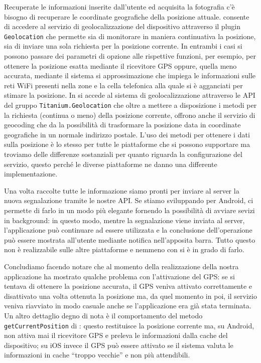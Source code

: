 			Recuperate le informazioni inserite dall'utente ed acquisita la
			fotografia c'è bisogno di recuperare le coordinate geografiche della
			posizione attuale. \pg{} consente di accedere al servizio di
			geolocalizzazione del dispositivo attraverso il plugin
			\texttt{Geolocation} che permette sia di monitorare in maniera
			continuativa la posizione, sia di inviare una sola richiesta per la
			posizione corrente. In entrambi i casi si possono passare dei
			parametri di opzione alle rispettive funzioni, per esempio, per
			ottenere la posizione esatta mediante il ricevitore GPS oppure,
			quella meno accurata, mediante il sistema si approssimazione che
			impiega le informazioni sulle reti WiFi presenti nella zone e la
			cella telefonica alla quale si è agganciati per stimare la
			posizione. In \tisdk{} si accede al sistema di
			geolocalizzazione attraverso le API del gruppo
			\texttt{Titanium.Geolocation} che oltre a mettere a disposizione i
			metodi per la richiesta (continua o meno) della posizione corrente,
			offrono anche il servizio di geocoding che da la possibilità di
			trasformare la posizione data in coordinate geografiche in un
			normale indirizzo postale. L'uso dei metodi per ottenere i dati
			sulla posizione è lo stesso per tutte le piattaforme che si possono
			supportare ma troviamo delle differenze sostanziali per quanto
			riguarda la configurazione del servizio, questo perché le diverse
			piattaforme ne danno una differente implementazione.
			
			Una volta raccolte tutte le informazione siamo pronti per inviare
			al server la nuova segnalazione tramite le nostre API. Se stiamo
			sviluppando per Android, \tiadk{} ci permette di farlo in un modo
			più elegante fornendo la possibilità di avviare sevizi in
			background: in questo modo, mentre la segnalazione viene inviata al
			server, l'applicazione può continuare ad essere utilizzata e la
			conclusione dell'operazione	può essere mostrata all'utente mediante
			notifica nell'apposita barra. Tutto questo non è realizzabile sulle
			altre piattaforme e nemmeno con \pg{} si è in grado di farlo.
			
			Concludiamo facendo notare che al momento della realizzazione della
			nostra applicazione \pg{} ha mostrato qualche problema con
			l'attivazione del GPS: se si tentava di ottenere la posizione
			accurata, il GPS veniva attivato correttamente e disattivato una
			volta ottenuta la posizione ma, da quel momento in poi, il servizio
			veniva riavviato in modo casuale anche se l'applicazione era già
			stata terminata. Un altro dettaglio degno di nota è il comportamento
			del metodo \texttt{getCurrentPosition} di \tisdk{}: questo
			restituisce la posizione corrente ma, su Android, non attiva mai il
			ricevitore GPS e preleva le informazioni dalla cache del
			dispositivo; su iOS invece il GPS può essere attivato se il sistema
			valuta le informazioni in cache ``troppo vecchie'' e non più
			attendibili.
			
			
